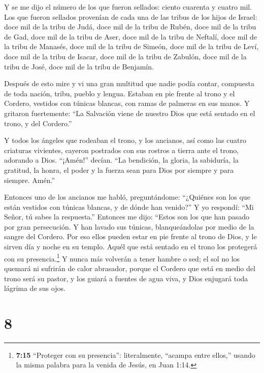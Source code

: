  Y se me dijo el número de los que fueron sellados: ciento
cuarenta y cuatro mil. Los que fueron sellados provenían de cada una de
las tribus de los hijos de Israel:  doce mil de la tribu de
Judá, doce mil de la tribu de Rubén, doce mil de la tribu de Gad,
 doce mil de la tribu de Aser, doce mil de la tribu de
Neftalí, doce mil de la tribu de Manasés,  doce mil de la
tribu de Simeón, doce mil de la tribu de Leví, doce mil de la tribu de
Isacar,  doce mil de la tribu de Zabulón, doce mil de la
tribu de José, doce mil de la tribu de Benjamín.

 Después de esto mire y vi una gran multitud que nadie podía
contar, compuesta de toda nación, tribu, pueblo y lengua. Estaban en pie
frente al trono y el Cordero, vestidos con túnicas blancas, con ramas de
palmeras en sus manos.  Y gritaron fuertemente: ``La
Salvación viene de nuestro Dios que está sentado en el trono, y del
Cordero.''

 Y todos los ángeles que rodeaban el trono, y los ancianos,
así como las cuatro criaturas vivientes, cayeron postrados con sus
rostros a tierra ante el trono, adorando a Dios. 
``¡Amén!'' decían. ``La bendición, la gloria, la sabiduría, la gratitud,
la honra, el poder y la fuerza sean para Dios por siempre y para
siempre. Amén.''

 Entonces uno de los ancianos me habló, preguntándome:
``¿Quiénes son los que están vestidos con túnicas blancas, y de dónde
han venido?''  Y yo respondí: ``Mi Señor, tú sabes la
respuesta.'' Entonces me dijo: ``Estos son los que han pasado por gran
persecución. Y han lavado sus túnicas, blanqueándolas por medio de la
sangre del Cordero.  Por eso ellos pueden estar en pie
frente al trono de Dios, y le sirven día y noche en su templo. Aquél que
está sentado en el trono los protegerá con su presencia.\footnote{\textbf{7:15}
  ``Proteger con su presencia'': literalmente, ``acampa entre ellos,''
  usando la misma palabra para la venida de Jesús, en Juan 1:14.}
 Y nunca más volverán a tener hambre o sed; el sol no los
quemará ni sufrirán de calor abrasador,  porque el Cordero
que está en medio del trono será su pastor, y los guiará a fuentes de
agua viva, y Dios enjugará toda lágrima de sus ojos.

\hypertarget{section-7}{%
\section{8}\label{section-7}}

